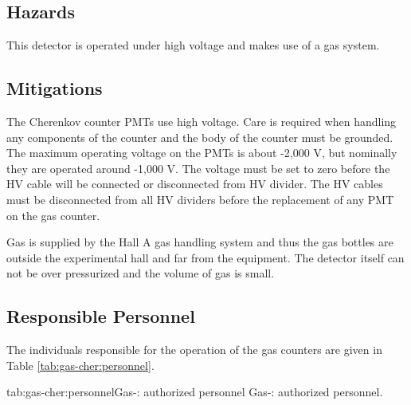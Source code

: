 \begin{safetyen}{0}{0}

\subsection{Hazards}

This detector is operated under high voltage and makes use of a gas system.

\subsection{Mitigations}

The Cherenkov counter PMTs use high voltage. Care is required when handling any 
components of the counter and the body of the \Cherenkov{} counter must be grounded. 
The maximum operating voltage on the PMTs is about -2,000 V, but
nominally they are operated around -1,000 V. The voltage must be set to
zero before the HV cable will be connected or disconnected from HV divider.
The HV cables must be disconnected from all HV dividers before the replacement
of any PMT on the gas \Cherenkov{} counter. 


Gas is supplied by the Hall A gas handling system and thus the gas bottles are outside
the experimental hall and far from the equipment.   The detector itself can not be over
pressurized and the volume of gas is small.

\subsection{Responsible Personnel} 

The individuals responsible for the operation 
of the gas \Cherenkov{} counters are given in Table \ref{tab:gas-cher:personnel}.

\begin{namestab}{tab:gas-cher:personnel}{Gas-\Cherenkov{}: authorized personnel}{%
      Gas-\Cherenkov{}: authorized personnel.}
  \EllenBecker{}
\end{namestab}
\end{safetyen}







